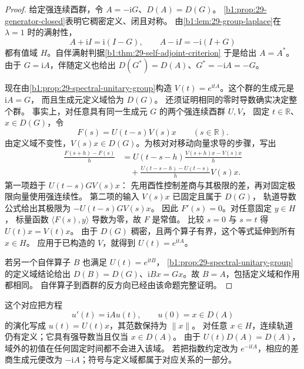 \begin{proof}
给定强连续酉群，令 \(A=-\mathrm iG\)、\(D(A)=D(G)\)。
\cref{b1:prop:29-generator-closed}表明它稠密定义、闭且对称。
由\cref{b1:lem:29-group-laplace}在 \(\lambda=1\) 时的满射性，
\[
 A+\mathrm iI=\mathrm i(I-G),\qquad
 A-\mathrm iI=-\mathrm i(I+G)
\]
都有值域 \(H\)。自伴满射判据\cref{b1:thm:29-self-adjoint-criterion}
于是给出 \(A=A^*\)。由于 \(G=\mathrm iA\)，伴随定义也给出
\(D(G^*)=D(A)\)、\(G^*=-\mathrm iA=-G\)。

现在由\cref{b1:prop:29-spectral-unitary-group}构造
\(V(t)=e^{\mathrm itA}\)。这个群的生成元是 \(\mathrm iA=G\)，
而且生成元定义域恰为 \(D(G)\)。
还须证明相同的零时导数确实决定整个群。
事实上，对任意具有同一生成元 \(G\) 的两个强连续酉群 \(U,V\)，
固定 \(t\in\mathbb R\)、\(x\in D(G)\)，令
\[
 F(s)=U(t-s)V(s)x\qquad(s\in\mathbb R).
\]
由定义域不变性，\(V(s)x\in D(G)\)。为核对对移动向量求导的步骤，写出
\[
 \begin{split}
 \frac{F(s+h)-F(s)}{h}
 &=U(t-s-h)\frac{V(s+h)x-V(s)x}{h}\\
 &\quad+\frac{U(t-s-h)-U(t-s)}{h}V(s)x.
 \end{split}
\]
第一项趋于 \(U(t-s)GV(s)x\)：
先用酉性控制差商与其极限的差，再对固定极限向量使用强连续性。
第二项的输入 \(V(s)x\) 已固定且属于 \(D(G)\)，
轨道导数公式给出其极限为 \(-U(t-s)GV(s)x\)。
因此 \(F'(s)=0\)。对任意固定 \(y\in H\)，
标量函数 \(\langle F(s),y\rangle\) 导数为零，故 \(F\) 是常值。
比较 \(s=0\) 与 \(s=t\) 得 \(U(t)x=V(t)x\)。
由于 \(D(G)\) 稠密，且两个算子有界，这个等式延伸到所有 \(x\in H\)。
应用于已构造的 \(V\)，就得到 \(U(t)=e^{\mathrm itA}\)。

若另一个自伴算子 \(B\) 也满足 \(U(t)=e^{\mathrm itB}\)，
\cref{b1:prop:29-spectral-unitary-group}的定义域结论给出
\(D(B)=D(G)\)、\(\mathrm iBx=Gx\)。故 \(B=A\)，包括定义域和作用都相同。
自伴算子到酉群的反方向已经由该命题完整证明。
\end{proof}

这个对应把方程
\[
 u'(t)=\mathrm iAu(t),\qquad u(0)=x\in D(A)
\]
的演化写成 \(u(t)=U(t)x\)，其范数保持为 \(\|x\|\)。
对任意 \(x\in H\)，连续轨道仍有定义；它具有强导数当且仅当 \(x\in D(A)\)。
由于 \(U(t)D(A)=D(A)\)，域外的初值在任何固定时间都不会进入该域。
若把指数约定改为 \(e^{-\mathrm itA}\)，相应的差商生成元便改为
\(-\mathrm iA\)；符号与定义域都属于对应关系的一部分。
